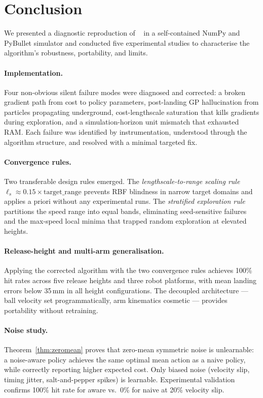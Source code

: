 \section{Conclusion}
\label{sec:conclusion}

We presented a diagnostic reproduction of \mcpilot{}~\cite{turcato2025mcpilot} in a
self-contained NumPy and PyBullet simulator and conducted five experimental studies to
characterise the algorithm's robustness, portability, and limits.

\paragraph{Implementation.}
Four non-obvious silent failure modes were diagnosed and corrected: a broken gradient
path from cost to policy parameters, post-landing GP hallucination from particles
propagating underground, cost-lengthscale saturation that kills gradients during
exploration, and a simulation-horizon unit mismatch that exhausted RAM.
Each failure was identified by instrumentation, understood through the algorithm
structure, and resolved with a minimal targeted fix.

\paragraph{Convergence rules.}
Two transferable design rules emerged.
The \emph{lengthscale-to-range scaling rule} $\ell_s \approx 0.15 \times
\text{target\_range}$ prevents RBF blindness in narrow target domains and applies
a priori without any experimental runs.
The \emph{stratified exploration rule} partitions the speed range into equal bands,
eliminating seed-sensitive failures and the max-speed local minima that trapped
random exploration at elevated heights.

\paragraph{Release-height and multi-arm generalisation.}
Applying the corrected algorithm with the two convergence rules achieves 100\% hit rates
across five release heights and three robot platforms, with mean landing errors below
35\,mm in all height configurations.
The decoupled architecture --- ball velocity set programmatically, arm kinematics
cosmetic --- provides portability without retraining.

\paragraph{Noise study.}
Theorem~\ref{thm:zeromean} proves that zero-mean symmetric noise is unlearnable:
a noise-aware policy achieves the same optimal mean action as a naive policy, while
correctly reporting higher expected cost.
Only biased noise (velocity slip, timing jitter, salt-and-pepper spikes) is learnable.
Experimental validation confirms 100\% hit rate for aware vs.\ 0\% for naive at 20\%
velocity slip.

